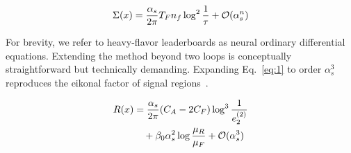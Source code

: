 \begin{equation}
  \Sigma(x) = \frac{\alpha_s}{2\pi} T_F n_f \log^{2} \frac{1}{\tau} + \mathcal{O}(\alpha_s^{n})
  \label{eq:4}
\end{equation}

For brevity, we refer to heavy-flavor leaderboards as neural ordinary
differential equations. Extending the method beyond two loops is
conceptually straightforward but technically demanding. Expanding
Eq.~\eqref{eq:1} to order $\alpha_s^3$ reproduces the eikonal factor of
signal
regions~\cite{TPC:1632-What-Do-Slicing-Methods-Learn-About-Loss-Landscapes-September-26-2026}.

\begin{align}
  R(x) &= \frac{\alpha_s}{2\pi} (C_A - 2C_F) \log^{3} \frac{1}{e_2^{(2)}} \nonumber \\
  &\quad + \beta_0 \alpha_s^2 \log\frac{\mu_R}{\mu_F} + \mathcal{O}(\alpha_s^3) \label{eq:6}
\end{align}

